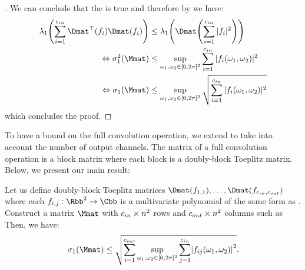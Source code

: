 \begin{proof}[]
\noindent
We can conclude that the  is true and therefore by  we have:
\begin{align}
  \lambda_1 \left( \sum_{i=1}^{\cin} \Dmat^{\top} \left(f_i \right) \Dmat (f_i) \right) &\leq \lambda_1 \left( \Dmat \left( \sum_{i=1}^{\cin} |f_i|^2 \right) \right) \\
  \Leftrightarrow \sigma_1^2 \left( \Mmat \right) &\leq \sup_{\omega_1, \omega_2 \in [0, 2\pi]^2} \sum_{i=1}^{\cin} |f_i(\omega_1, \omega_2)|^2 \\
  \Leftrightarrow \sigma_1 \left( \Mmat \right) &\leq \sup_{\omega_1, \omega_2 \in [0, 2\pi]^2} \sqrt{ \sum_{i=1}^{\cin} |f_i(\omega_1, \omega_2)|^2 }
\end{align}
which concludes the proof. 
\end{proof}

\endgroup

\pagebreak

To have a bound on the full convolution operation, we extend  to take into account the number of output channels.
The matrix of a full convolution operation is a block matrix where each block is a doubly-block Toeplitz matrix.
Below, we present our main result:

\begin{maintheorem} \label{theorem:ch5-bound_max_sv_convolution} 
  Let us define doubly-block Toeplitz matrices $\Dmat(f_{1, 1}), \dots, \Dmat(f_{\cin, \cout})$ where each $f_{i,j}: \Rbb^2 \rightarrow \Cbb$ is a multivariate polynomial of the same form as .
  Construct a matrix $\Mmat$ with $c_{in}\times n^2$ rows and $c_{out}\times n^2$ columns such as
  Then, we have:
  \begin{equation} \label{equation:lipbound_sv}
     \sigma_1 \left( \Mmat \right) \leq \sqrt{ \sum_{i=1}^{\cout} \sup_{\omega_1, \omega_2 \in [0, 2\pi]^2} \sum_{j = 1}^{\cin} \left|f_{ij}(\omega_1, \omega_2) \right|^2 } .
  \end{equation} 
  \removespace
\end{maintheorem}

